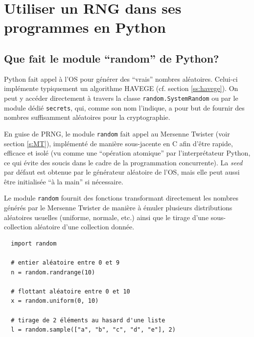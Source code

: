 \documentclass{scrartcl}
\begin{document}
\section{Utiliser un RNG dans ses programmes en Python}
\subsection{Que fait le module ``random'' de Python?}\label{ss:python}
Python fait appel à l'OS pour générer des ``vrais'' nombres aléatoires.
Celui-ci implémente typiquement un algorithme HAVEGE (cf. section \ref{ss:havege}).
On peut y accéder directement à travers la classe \texttt{random.SystemRandom} ou par
le module dédié  \texttt{secrets}, qui, comme son nom l'indique, a pour but de
fournir des nombres suffisamment aléatoires pour la cryptographie.

En guise de PRNG, le module \texttt{random} fait appel au Mersenne Twister (voir
section \ref{s:MT}), implémenté de manière sous-jacente en C afin d'être rapide,
efficace et isolé (vu comme une ``opération atomique'' par l'interprétateur
Python, ce qui évite des soucis dans le cadre de la programmation concurrente).
La \textit{seed} par défaut est obtenue par le générateur aléatoire de l'OS,
mais elle peut aussi être initialisée ``à la main'' si nécessaire.

Le module \texttt{random} fournit des fonctions transformant directement les
nombres générés par le Mersenne Twister de manière à émuler plusieurs
distributions aléatoires usuelles (uniforme, normale, etc.) ainsi que le tirage
d'une sous-collection aléatoire d'une collection donnée.
\begin{lstlisting}
  import random

  # entier aléatoire entre 0 et 9
  n = random.randrange(10)

  # flottant aléatoire entre 0 et 10
  x = random.uniform(0, 10)

  # tirage de 2 éléments au hasard d'une liste
  l = random.sample(["a", "b", "c", "d", "e"], 2)
\end{lstlisting}
\end{document}
